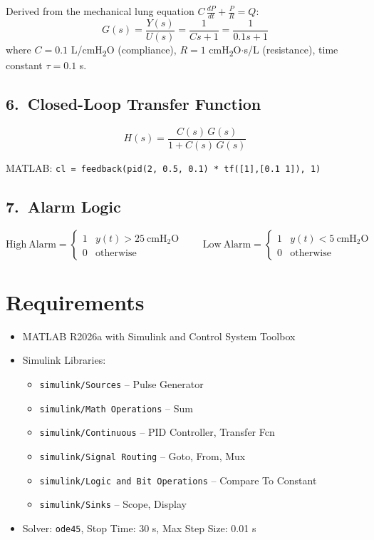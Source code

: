 \documentclass[12pt,a4paper]{article}
\begin{document}
Derived from the mechanical lung equation $C\,\frac{dP}{dt} + \frac{P}{R} = Q$:
\[
G(s) = \frac{Y(s)}{U(s)} = \frac{1}{Cs+1} = \frac{1}{0.1s+1}
\]
where $C = 0.1$ L/cmH\textsubscript{2}O (compliance), $R = 1$ cmH\textsubscript{2}O$\cdot$s/L (resistance), time constant $\tau = 0.1$ s.

\subsection*{6.\ Closed-Loop Transfer Function}

\[
H(s) = \frac{C(s)\,G(s)}{1 + C(s)\,G(s)}
\]

MATLAB: \texttt{cl = feedback(pid(2, 0.5, 0.1) * tf([1],[0.1 1]), 1)}

\subsection*{7.\ Alarm Logic}

\[
\mathrm{High\ Alarm} = \begin{cases}1 & y(t)>25\ \mathrm{cmH_2O}\\ 0 & \mathrm{otherwise}\end{cases}
\qquad
\mathrm{Low\ Alarm} = \begin{cases}1 & y(t)<5\ \mathrm{cmH_2O}\\ 0 & \mathrm{otherwise}\end{cases}
\]

\section{Requirements}

\begin{itemize}
  \item MATLAB R2026a with Simulink and Control System Toolbox
  \item Simulink Libraries:
  \begin{itemize}
    \item \texttt{simulink/Sources} -- Pulse Generator
    \item \texttt{simulink/Math Operations} -- Sum
    \item \texttt{simulink/Continuous} -- PID Controller, Transfer Fcn
    \item \texttt{simulink/Signal Routing} -- Goto, From, Mux
    \item \texttt{simulink/Logic and Bit Operations} -- Compare To Constant
    \item \texttt{simulink/Sinks} -- Scope, Display
  \end{itemize}
  \item Solver: \texttt{ode45}, Stop Time: 30 s, Max Step Size: 0.01 s
\end{itemize}
\end{document}
